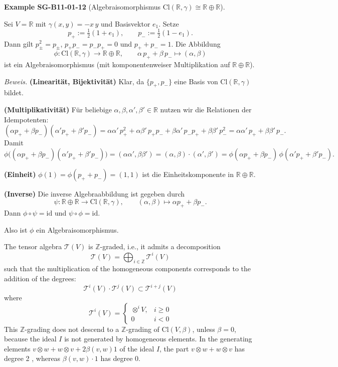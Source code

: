 \documentclass[10pt, letterpaper]{article}
\newcommand{\Cl}{\mathrm{Cl}}
\newcommand{\CustomHeading}[3]{%
  \par\medskip\noindent%
  \textbf{#1 #2} \textnormal{(#3)}.\enskip%
}
\newenvironment{EXA}[2]{\begin{unitbox}\CustomHeading{Example}{#1}{#2}}{\end{unitbox}}
\begin{document}
\begin{EXA}{SG-B11-01-12}{Algebraisomorphismus $\Cl(\mathbb{R},\gamma)\cong \mathbb{R}\oplus\mathbb{R}$}
Sei $V=\mathbb{R}$ mit $\gamma(x,y)=-x\,y$ und Basisvektor $e_1$. Setze
\[
p_{+}:=\tfrac12(1+e_1),\qquad p_{-}:=\tfrac12(1-e_1).
\]
Dann gilt $p_{\pm}^2=p_{\pm}$, $p_{+}p_{-}=p_{-}p_{+}=0$ und $p_{+}+p_{-}=1$.
Die Abbildung
\[
\phi:\Cl(\mathbb{R},\gamma)\longrightarrow \mathbb{R}\oplus\mathbb{R},\qquad 
\alpha\,p_{+}+\beta\,p_{-}\longmapsto (\alpha,\beta)
\]
ist ein Algebraisomorphismus (mit komponentenweiser Multiplikation auf $\mathbb{R}\oplus\mathbb{R}$).

\medskip
\emph{Beweis.}
\textbf{(Linearität, Bijektivität)} Klar, da $\{p_{+},p_{-}\}$ eine Basis von $\Cl(\mathbb{R},\gamma)$ bildet.

\smallskip
\textbf{(Multiplikativität)}
Für beliebige $\alpha,\beta,\alpha',\beta'\in\mathbb{R}$ nutzen wir die Relationen der Idempotenten:
\[
(\alpha p_{+}+\beta p_{-})(\alpha' p_{+}+\beta' p_{-})
=\alpha\alpha'\,p_{+}^2+\alpha\beta'\,p_{+}p_{-}+\beta\alpha'\,p_{-}p_{+}+\beta\beta'\,p_{-}^2
=\alpha\alpha'\,p_{+}+\beta\beta'\,p_{-}.
\]
Damit
\[
\phi\big((\alpha p_{+}+\beta p_{-})(\alpha' p_{+}+\beta' p_{-})\big)
=(\alpha\alpha',\beta\beta')
=(\alpha,\beta)\cdot(\alpha',\beta')
=\phi(\alpha p_{+}+\beta p_{-})\,\phi(\alpha' p_{+}+\beta' p_{-}).
\]

\smallskip
\textbf{(Einheit)} $\phi(1)=\phi(p_{+}+p_{-})=(1,1)$ ist die Einheitskomponente in $\mathbb{R}\oplus\mathbb{R}$.

\smallskip
\textbf{(Inverse)}
Die inverse Algebraabbildung ist gegeben durch
\[
\psi:\mathbb{R}\oplus\mathbb{R}\to \Cl(\mathbb{R},\gamma),\qquad (\alpha,\beta)\mapsto \alpha p_{+}+\beta p_{-}.
\]
Dann $\phi\circ\psi=\mathrm{id}$ und $\psi\circ\phi=\mathrm{id}$.

\smallskip
Also ist $\phi$ ein Algebraisomorphismus.
\end{EXA}




The tensor algebra $\mathcal{T}(V)$ is $\mathbb{Z}$-graded, i.e., it admits a decomposition
$$
\mathcal{T}(V)=\bigoplus_{i \in \mathbb{Z}} \mathcal{T}^{i}(V)
$$
such that the multiplication of the homogeneous components corresponds to the addition of the degrees:
$$
\mathcal{T}^{i}(V) \cdot \mathcal{T}^{j}(V) \subset \mathcal{T}^{i+j}(V)
$$
where
$$
\mathcal{T}^{i}(V)= \begin{cases}\otimes^{i} V, & i \geq 0 \\ 0 & i<0\end{cases}
$$
This $\mathbb{Z}$-grading does not descend to a $\mathbb{Z}$-grading of $\mathrm{Cl}(V, \beta)$, unless $\beta=0$, because the ideal $I$ is not generated by homogeneous elements. In the generating elements $v \otimes w+w \otimes v+2 \beta(v, w) 1$ of the ideal $I$, the part $v \otimes w+w \otimes v$ has degree 2 , whereas $\beta(v, w) \cdot 1$ has degree 0.
\end{document}

